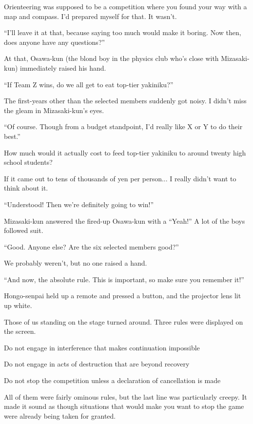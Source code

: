 \documentclass[
    a4paper,
    12pt,
    twoside,
    openany,
    UTF8,
    fontset=windows
]{ctexbook}
\begin{document}
Orienteering was supposed to be a competition where you found your way with a map and compass. I'd prepared myself for that. It wasn't.

``I'll leave it at that, because saying too much would make it boring. Now then, does anyone have any questions?''

At that, Osawa-kun (the blond boy in the physics club who's close with Mizasaki-kun) immediately raised his hand.

``If Team Z wins, do we all get to eat top-tier yakiniku?''

The first-years other than the selected members suddenly got noisy. I didn't miss the gleam in Mizasaki-kun's eyes.

``Of course. Though from a budget standpoint, I'd really like X or Y to do their best.''

How much would it actually cost to feed top-tier yakiniku to around twenty high school students?

If it came out to tens of thousands of yen per person... I really didn't want to think about it.

``Understood! Then we're definitely going to win!''

Mizasaki-kun answered the fired-up Osawa-kun with a ``Yeah!'' A lot of the boys followed suit.

``Good. Anyone else? Are the six selected members good?''

We probably weren't, but no one raised a hand.

``And now, the absolute rule. This is important, so make sure you remember it!''

Hongo-senpai held up a remote and pressed a button, and the projector lens lit up white.

Those of us standing on the stage turned around. Three rules were displayed on the screen.

\begin{center}
Do not engage in interference that makes continuation impossible

Do not engage in acts of destruction that are beyond recovery

Do not stop the competition unless a declaration of cancellation is made
\end{center}

All of them were fairly ominous rules, but the last line was particularly creepy. It made it sound as though situations that would make you want to stop the game were already being taken for granted.
\end{document}
